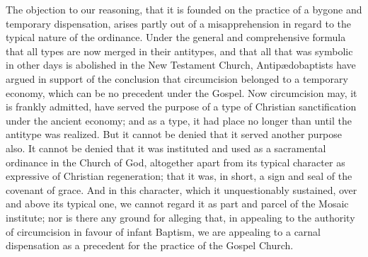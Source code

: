 \documentclass[]{book}
\begin{document}
\begin{enumerate}
  The objection to our reasoning, that it is founded on the practice of a bygone and temporary dispensation, arises partly out of a misapprehension in regard to the typical nature of the ordinance. Under the general and comprehensive formula that all types are now merged in their antitypes, and that all that was symbolic in other days is abolished in the New Testament Church, Antipædobaptists have argued in support of the conclusion that circumcision belonged to a temporary economy, which can be no precedent under the Gospel. Now circumcision may, it is frankly admitted, have served the purpose of a type of Christian sanctification under the ancient economy; and as a type, it had place no longer than until the antitype was realized. But it cannot be denied that it served another purpose also. It cannot be denied that it was instituted and used as a sacramental ordinance in the Church of God, altogether apart from its typical character as expressive of Christian regeneration; that it was, in short, a sign and seal of the covenant of grace. And in this character, which it unquestionably sustained, over and above its typical one, we cannot regard it as part and parcel of the Mosaic institute; nor is there any ground for alleging that, in appealing to the authority of circumcision in favour of infant Baptism, we are appealing to a carnal dispensation as a precedent for the practice of the Gospel Church.
\end{enumerate}
\end{document}
